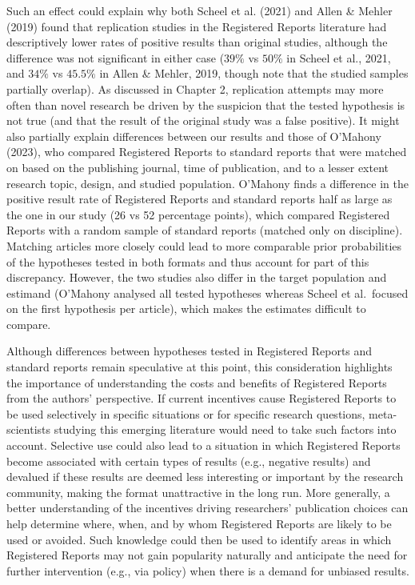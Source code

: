 \documentclass[
  ,man,mask,floatsintext]{apa6}
\begin{document}
Such an effect could explain why both Scheel et al. (2021) and Allen \& Mehler (2019) found that replication studies in the Registered Reports literature had descriptively lower rates of positive results than original studies, although the difference was not significant in either case (\(39\%\) vs \(50\%\) in Scheel et al., 2021, and \(34\%\) vs \(45.5\%\) in Allen \& Mehler, 2019, though note that the studied samples partially overlap).
As discussed in Chapter 2, replication attempts may more often than novel research be driven by the suspicion that the tested hypothesis is not true (and that the result of the original study was a false positive).
It might also partially explain differences between our results and those of O'Mahony (2023), who compared Registered Reports to standard reports that were matched on based on the publishing journal, time of publication, and to a lesser extent research topic, design, and studied population.
O'Mahony finds a difference in the positive result rate of Registered Reports and standard reports half as large as the one in our study (26 vs 52 percentage points), which compared Registered Reports with a random sample of standard reports (matched only on discipline).
Matching articles more closely could lead to more comparable prior probabilities of the hypotheses tested in both formats and thus account for part of this discrepancy.
However, the two studies also differ in the target population and estimand (O'Mahony analysed all tested hypotheses whereas Scheel et al.~focused on the first hypothesis per article), which makes the estimates difficult to compare.

Although differences between hypotheses tested in Registered Reports and standard reports remain speculative at this point, this consideration highlights the importance of understanding the costs and benefits of Registered Reports from the authors' perspective.
If current incentives cause Registered Reports to be used selectively in specific situations or for specific research questions, meta-scientists studying this emerging literature would need to take such factors into account.
Selective use could also lead to a situation in which Registered Reports become associated with certain types of results (e.g., negative results) and devalued if these results are deemed less interesting or important by the research community, making the format unattractive in the long run.
More generally, a better understanding of the incentives driving researchers' publication choices can help determine where, when, and by whom Registered Reports are likely to be used or avoided.
Such knowledge could then be used to identify areas in which Registered Reports may not gain popularity naturally and anticipate the need for further intervention (e.g., via policy) when there is a demand for unbiased results.
\end{document}
